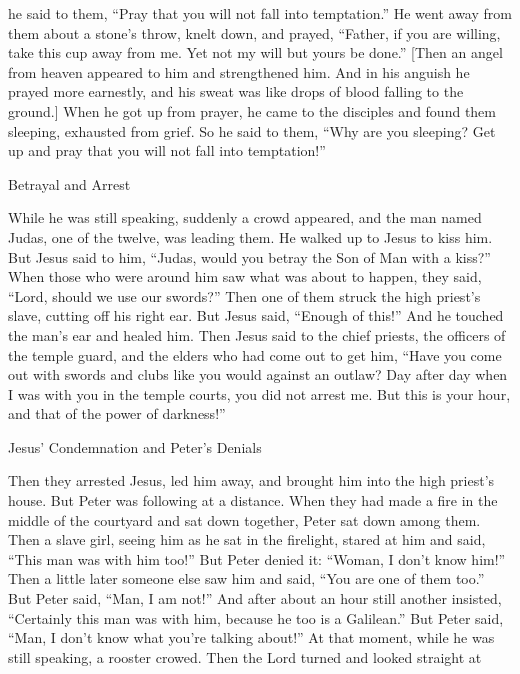 {he said
to them,
“Pray
that you will
not
fall
into
temptation.”
He
went away
from
them
about
a stone’s
throw,
knelt down,
and
prayed,
“Father,
if
you are willing,
take
this
cup
away
from
me.
Yet
not
my
will
but
yours
be done.”
[Then
an angel
from
heaven
appeared
to him
and strengthened
him.
And
in
his anguish
he prayed
more earnestly,
and
his
sweat
was like
drops
of blood
falling
to
the ground.]
When
he got up
from
prayer,
he came
to
the disciples
and found
them
sleeping, exhausted
from
grief.
So
he said
to them,
“Why
are you sleeping? Get up
and pray
that
you will
not
fall
into
temptation!”
\par }{\SH Betrayal and Arrest
\par }{\PP {}While
he
was
still
speaking,
suddenly
a crowd
appeared, and
the man named
Judas,
one
of the twelve,
was leading
them.
He walked up
to Jesus
to kiss
him.
But
Jesus
said
to him,
“Judas,
would you betray
the Son
of Man
with a kiss?”
When
those who were
around
him
saw
what was about to happen,
they said,
“Lord,
should we use
our swords?”
Then
one
of
them
struck
the high priest’s
slave,
cutting off
his
right
ear.
But
Jesus
said, “Enough
of this!” And
he touched
the man’s ear
and healed
him.
Then
Jesus
said
to
the chief priests,
the officers of the
temple
guard,
and
the elders
who had come out
to get
him,
“Have you come out
with
swords
and
clubs
like
you would against
an outlaw?
Day after day
when
I
was
with
you
in
the temple courts,
you did
not
arrest
me.
But
this
is
your
hour,
and
that of the power
of darkness!”
\par }{\SH Jesus’ Condemnation and Peter’s Denials
\par }{\PP {}Then
they arrested
Jesus,
led
him away,
and
brought
him into
the high priest’s
house.
But
Peter
was following
at a distance.
When
they had made
a fire
in
the middle
of the courtyard
and
sat down together,
Peter
sat down
among
them.
Then
a slave girl,
seeing
him
as
he sat
in
the firelight,
stared at
him
and
said,
“This man
was
with
him too!”
But
Peter denied
it: “Woman,
I
don’t
know
him!”
Then
a little later
someone else
saw
him
and
said,
“You
are
one of
them
too.” But
Peter
said,
“Man,
I am
not!”
And
after about
an
hour
still another
insisted, “Certainly
this man
was with
him,
because
he
too
is
a Galilean.”
But
Peter
said,
“Man,
I
don’t
know
what
you’re talking about!” At that moment,
while
he
was
still
speaking,
a rooster
crowed.
Then
the Lord
turned
and looked straight at
}
